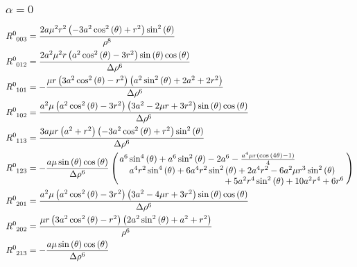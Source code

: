 \documentclass[11pt,a4paper]{article}
\begin{document}
\subsubsection*{$\alpha = 0$}
\begin{align}
	R^0_{\phantom{0} 0 0 3} &=\frac{2 a \mu^{2} r^{2} \left(- 3 a^{2} \cos^{2}{\left(\theta \right)} + r^{2}\right) \sin^{2}{\left(\theta \right)}}{\rho^{8}}\\
	R^0_{\phantom{0} 0 1 2} &=\frac{2 a^{2} \mu^{2} r \left(a^{2} \cos^{2}{\left(\theta \right)} - 3 r^{2}\right) \sin{\left(\theta \right)} \cos{\left(\theta \right)}}{\Delta \rho^{6}}\\
	R^0_{\phantom{0} 1 0 1} &=- \frac{\mu r \left(3 a^{2} \cos^{2}{\left(\theta \right)} - r^{2}\right) \left(a^{2} \sin^{2}{\left(\theta \right)} + 2 a^{2} + 2 r^{2}\right)}{\Delta \rho^{6}}\\
	R^0_{\phantom{0} 1 0 2} &=\frac{a^{2} \mu \left(a^{2} \cos^{2}{\left(\theta \right)} - 3 r^{2}\right) \left(3 a^{2} - 2 \mu r + 3 r^{2}\right) \sin{\left(\theta \right)} \cos{\left(\theta \right)}}{\Delta \rho^{6}}\\
	R^0_{\phantom{0} 1 1 3} &=\frac{3 a \mu r \left(a^{2} + r^{2}\right) \left(- 3 a^{2} \cos^{2}{\left(\theta \right)} + r^{2}\right) \sin^{2}{\left(\theta \right)}}{\Delta \rho^{6}}\\
	R^0_{\phantom{0} 1 2 3} &=- \frac{a \mu\sin{\left(\theta \right)} \cos{(\theta)}}{\Delta \rho^{6}}
	\left( \splitfrac{a^{6} \sin^{4}{\left(\theta \right)} + a^{6} \sin^{2}{\left(\theta \right)} - 2 a^{6} - \frac{a^{4} \mu r \left(\cos{\left(4 \theta \right)} - 1\right)}{4} }{\splitfrac{a^{4} r^{2} \sin^{4}{\left(\theta \right)} + 6 a^{4} r^{2} \sin^{2}{\left(\theta \right)} + 2 a^{4} r^{2}- 6 a^{2} \mu r^{3} \sin^{2}{\left(\theta \right)}}{+ 5 a^{2} r^{4} \sin^{2}{\left(\theta \right)} + 10 a^{2} r^{4} + 6 r^{6}} }\right)\\
	R^0_{\phantom{0} 2 0 1} &=\frac{a^{2} \mu \left(a^{2} \cos^{2}{\left(\theta \right)} - 3 r^{2}\right) \left(3 a^{2} - 4 \mu r + 3 r^{2}\right) \sin{\left(\theta \right)} \cos{\left(\theta \right)}}{\Delta \rho^{6}}\\
	R^0_{\phantom{0} 2 0 2} &=\frac{\mu r \left(3 a^{2} \cos^{2}{\left(\theta \right)} - r^{2}\right) \left(2 a^{2} \sin^{2}{\left(\theta \right)} + a^{2} + r^{2}\right)}{\rho^{6}}\\
	R^0_{\phantom{0} 2 1 3} &=- \frac{a \mu\sin{\left(\theta \right)} \cos{\left(\theta \right)}}{\Delta \rho^{6}}

\end{align}
\end{document}
